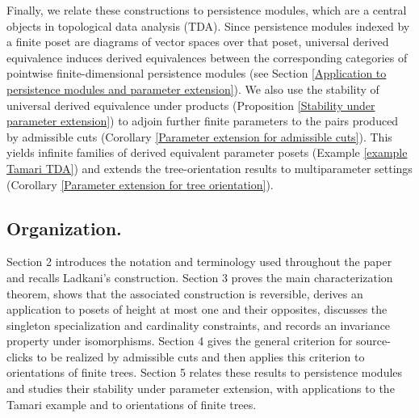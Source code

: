Finally, we relate these constructions to persistence modules, which are a central objects in topological data analysis (TDA). Since persistence modules indexed by a finite poset are diagrams of vector spaces over that poset, universal derived equivalence induces derived equivalences between the corresponding categories of pointwise finite-dimensional persistence modules (see Section \ref{Application to persistence modules and parameter extension}). We also use the stability of universal derived equivalence under products (Proposition \ref{Stability under parameter extension}) to adjoin further finite parameters to the pairs produced by admissible cuts (Corollary \ref{Parameter extension for admissible cuts}). This yields infinite families of derived equivalent parameter posets (Example \ref{example Tamari TDA}) and extends the tree-orientation results to multiparameter settings (Corollary \ref{Parameter extension for tree orientation}).

\subsection*{Organization.}
Section 2 introduces the notation and terminology used throughout the paper and recalls Ladkani's construction. Section 3 proves the main characterization theorem, shows that the associated construction is reversible, derives an application to posets of height at most one and their opposites, discusses the singleton specialization and cardinality constraints, and records an invariance property under isomorphisms. Section 4 gives the general criterion for source-clicks to be realized by admissible cuts and then applies this criterion to orientations of finite trees. Section 5 relates these results to persistence modules and studies their stability under parameter extension, with applications to the Tamari example and to orientations of finite trees.